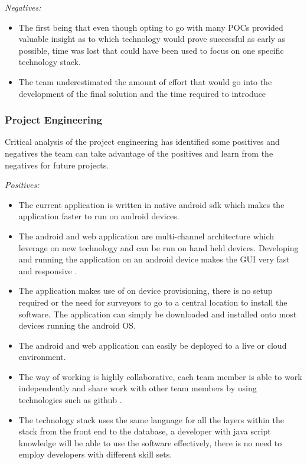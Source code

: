 \documentclass[12pt]{witseiepaper}
\begin{document}
\textit{Negatives:}

\begin{itemize}
\item The first being that even though opting to go with many POCs provided valuable insight as to which technology would prove successful as early as possible, time was lost that could have been used to focus on one specific technology stack.
\item The team underestimated the amount of effort that would go into the development of the final solution and the time required to introduce 
\end{itemize}

\subsubsection{Project Engineering}

Critical analysis of the project engineering has identified some positives and negatives the team can take advantage of the positives and learn from the negatives for future projects. 

\textit{Positives:}

\begin{itemize}
\item The current application is written in native android sdk which makes the application faster to run on android devices. 
\item The android and web application are multi-channel architecture which leverage on new technology and can be run on hand held devices. Developing and running the application on an android device makes the GUI very fast and responsive \cite{AndroidNative}.
\item The application makes use of on device provisioning, there is no setup required or the need for surveyors to go to a central location to install the software. The application can simply be downloaded and installed onto most devices running the android OS. 
\item The android and web application can easily be deployed to a live or cloud environment. 
\item The way of working is highly collaborative, each team member is able to work independently and share work with other team members by using technologies such as github \cite{GitHub}. 
\item The technology stack uses the same language for all the layers within the stack from the front end to the database, a developer with java script knowledge will be able to use the software effectively, there is no need to employ developers with different skill sets. 
\end{itemize}
\end{document}
